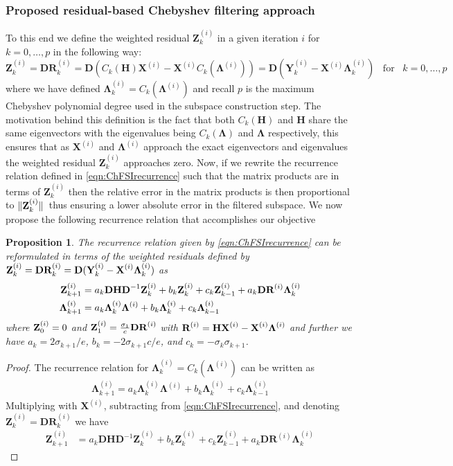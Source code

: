 \documentclass[preprint,3p,number,sort&compress]{elsarticle}
\newtheorem{proposition}[theorem]{Proposition}
\newcommand{\bD}{\textbf{D}}
\newcommand{\bH}{\textbf{H}}
\newcommand{\bX}{\textbf{X}}
\newcommand{\bY}{\textbf{Y}}
\newcommand{\bZ}{\textbf{Z}}
\newcommand{\bR}{\textbf{R}}
\newcommand{\bLam}{\boldsymbol{\Lambda}}
\DeclarePairedDelimiter\norm{\lVert}{\rVert\,}%
\begin{document}
\subsubsection{Proposed residual-based Chebyshev filtering approach}
To this end we define the weighted residual $\bZ^{(i)}_{k}$ in a given iteration $i$ for $k=0,\dots,p$ in the following way:
\begin{equation}
  \bZ_k^{(i)}=\bD\bR_k^{(i)}=\bD(C_k(\bH)\bX^{(i)}-\bX^{(i)} C_k(\bLam^{(i)}))=\bD(\bY_k^{(i)}-\bX^{(i)}\bLam_k^{(i)})\;\;\; \text{for} \;\;\; k=0,\dots,p \label{eqn:residual}
\end{equation}
where we have defined $\bLam_k^{(i)}=C_k(\bLam^{(i)})$ and recall $p$ is the maximum Chebyshev polynomial degree used in the subspace construction step. The motivation behind this definition is the fact that both $C_k(\bH)$ and $\bH$ share the same eigenvectors with the eigenvalues being $C_k(\bLam)$ and $\bLam$ respectively, this ensures that as $\bX^{(i)}$ and $\bLam^{(i)}$ approach the exact eigenvectors and eigenvalues the weighted residual $\bZ_k^{(i)}$ approaches zero. Now, if we rewrite the recurrence relation defined in \cref{eqn:ChFSIrecurrence} such that the matrix products are in terms of $\bZ_k^{(i)}$ then the relative error in the matrix products is then proportional to $\norm{\bZ_k^{(i)}}$ thus ensuring a lower absolute error in the filtered subspace. We now propose the following recurrence relation that accomplishes our objective
\begin{proposition}
 The recurrence relation given by \cref{eqn:ChFSIrecurrence} can be reformulated in terms of the weighted residuals defined by $\normalfont\bZ_k^{(i)}=\bD\bR_k^{(i)}=\bD(\bY_k^{(i)}-\bX^{(i)}\bLam_k^{(i)})$ as
 \begin{align}
  \normalfont\bZ_{k+1}^{(i)}&\normalfont=a_k\bD\bH\bD^{-1}\bZ_k^{(i)}+b_k\bZ_k^{(i)}+c_k\bZ_{k-1}^{(i)}+a_k\bD\bR^{(i)}\bLam_k^{(i)}\label{eqn:rChFSIrecurrence}\\
  \bLam_{k+1}^{(i)}&=a_k\bLam_k^{(i)}\bLam^{(i)}+b_k\bLam_k^{(i)}+c_k\bLam_{k-1}^{(i)}\label{eqn:ChFSIrecurrenceEigval}
 \end{align} 
where $\normalfont\bZ_0^{(i)}=0$ and $\normalfont\bZ_1^{(i)}=\frac{\sigma_{1}}{e}\bD\bR^{(i)}$ with $\normalfont\bR^{(i)}=\bH\bX^{(i)}-\bX^{(i)}\bLam^{(i)}$ and further we have $a_k=2\sigma_{k+1}/e$, $b_k=-2\sigma_{k+1}c/e$, and $c_k=-\sigma_k\sigma_{k+1}$.
\end{proposition}
\begin{proof}
 The recurrence relation for $\bLam_k^{(i)}=C_k(\bLam^{(i)})$ can be written as 
 \begin{align}
  \bLam_{k+1}^{(i)}=a_k\bLam_k^{(i)}\bLam^{(i)}+b_k\bLam_k^{(i)}+c_k\bLam_{k-1}^{(i)}\nonumber
 \end{align}
 Multiplying with $\bX^{(i)}$, subtracting from \cref{eqn:ChFSIrecurrence}, and denoting $\bZ_k^{(i)}=\bD\bR_k^{(i)}$ we have
 \begin{align*}
  \bZ_{k+1}^{(i)}&=a_k\bD\bH\bD^{-1}\bZ_k^{(i)}+b_k\bZ_k^{(i)}+c_k\bZ_{k-1}^{(i)}+a_k\bD\bR^{(i)}\bLam_k^{(i)}
 \end{align*}
\end{proof}
\end{document}
